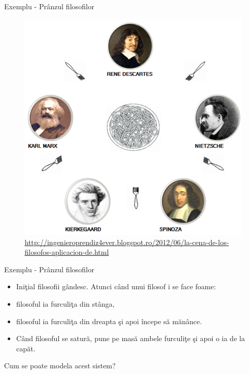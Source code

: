 \documentclass{beamer}
\begin{document}
\begin{frame}{Exemplu - Prânzul filosofilor}

\begin{figure}
\includegraphics[scale=0.4]{images/filo}
\caption{\label{fig:filo}\url{http://ingenieroprendiz4ever.blogspot.ro/2012/06/la-cena-de-los-filosofos-aplicacion-de.html}}
\end{figure}
\end{frame}



\begin{frame}{Exemplu - Prânzul filosofilor}
\begin{itemize}
\item
Iniţial filosofii gândesc. Atunci când unui filosof i se face foame:
\item
filosoful ia furculiţa din stânga,
\item
filosoful ia furculiţa din dreapta şi apoi începe să mănânce.
\item
Când filosoful se satură, pune pe masă ambele furculiţe şi apoi o ia de la capăt.
\end{itemize}

\vspace{0.5cm}

Cum se poate modela acest sistem?
\end{frame}
\end{document}
